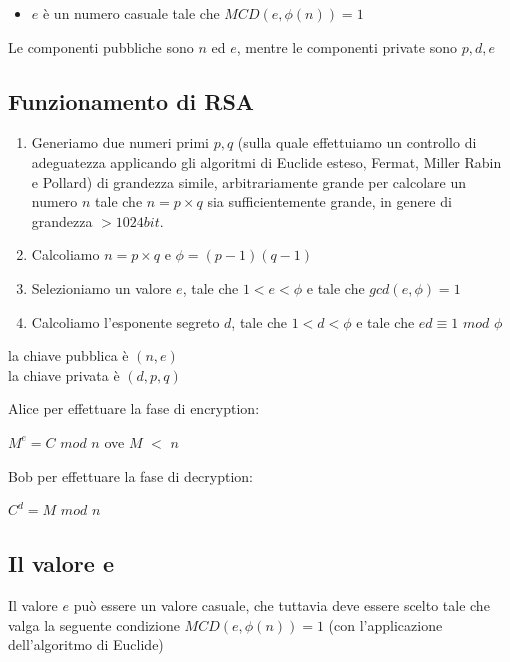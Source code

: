 \documentclass[11pt, oneside]{article}   	%
\begin{document}
\begin{itemize}
\item $e$ è un numero casuale tale che $MCD(e, \phi(n)) = 1$
\end{itemize}

Le componenti pubbliche sono $n$ ed $e$, mentre le componenti private sono $p, d, e$
\subsection*{Funzionamento di RSA}
\begin{enumerate}
\item Generiamo due numeri primi $p, q$ (sulla quale effettuiamo un controllo di adeguatezza applicando gli algoritmi di Euclide esteso, Fermat, Miller Rabin e Pollard) di grandezza simile, arbitrariamente grande per calcolare un numero $n$ tale che $n = p \times q$ sia sufficientemente grande, in genere di grandezza $> 1024 bit$. 
\item Calcoliamo $n = p \times q$ e $\phi = (p - 1)(q - 1)$
\item Selezioniamo un valore $e$, tale che $1 < e < \phi$ e tale che $gcd(e, \phi) = 1$
\item Calcoliamo l'esponente segreto $d$, tale che $1 < d < \phi$ e tale che $ed \equiv 1$ $mod$ $\phi$ 
\end{enumerate}
\begin{center}
la chiave pubblica è $(n, e)$\\
la chiave privata è $(d, p, q)$
\end{center}
Alice per effettuare la fase di encryption: \begin{center}
$M^{e} = C$ $mod$ $n$ ove $M$  $<$ $n$
\end{center}
Bob per effettuare la fase di decryption: \begin{center}
$C^d = M$ $mod$ $n$
\end{center}

\subsection*{Il valore e}
Il valore $e$ può essere un valore casuale, che tuttavia deve essere scelto tale che valga la seguente condizione $MCD(e, \phi(n))=1$ (con l'applicazione dell'algoritmo di Euclide)
\end{document}
